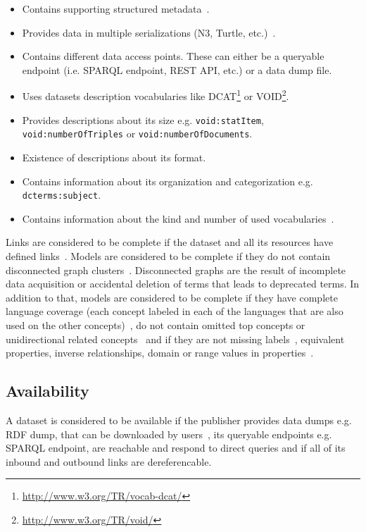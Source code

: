 \begin{itemize}
\item Contains supporting structured metadata~\cite{Hogan:LDOW:10}.
\item Provides data in multiple serializations (N3, Turtle, etc.)~\cite{Zaveri:SemWebJorunal:12}.
\item Contains different data access points. These can either be a queryable endpoint (i.e. SPARQL endpoint, REST API, etc.) or a data dump file.
\item Uses datasets description vocabularies like DCAT\footnote{\url{http://www.w3.org/TR/vocab-dcat/}} or VOID\footnote{\url{http://www.w3.org/TR/void/}}.
\item Provides descriptions about its size e.g. \texttt{void:statItem}, \texttt{void:numberOfTriples} or \texttt{void:numberOf\-Documents}.
\item Existence of descriptions about its format.
\item Contains information about its organization and categorization e.g. \texttt{dcterms:subject}.
\item Contains information about the kind and number of used vocabularies~\cite{Zaveri:SemWebJorunal:12}.
\end{itemize}

Links are considered to be complete if the dataset and all its resources have defined links~\cite{Hogan:LDOW:10,Mader:TBDL:12,Gueret:ESWC:12}. Models are considered to be complete if they do not contain disconnected graph clusters~\cite{Mader:TBDL:12}. Disconnected graphs are the result of incomplete data acquisition or accidental deletion of terms that leads to deprecated terms. In addition to that, models are considered to be complete if they have complete language coverage (each concept labeled in each of the languages that are also used on the other concepts)~\cite{Mader:TBDL:12}, do not contain omitted top concepts or unidirectional related concepts~\cite{Hogan:LDOW:10} and if they are not missing labels~\cite{Mader:TBDL:12}, equivalent properties, inverse relationships, domain or range values in properties~\cite{Maria:KEOD:13}.

\subsection{Availability}
A dataset is considered to be available if the publisher provides data dumps e.g. RDF dump, that can be downloaded by users~\cite{Flemming:Thesis:10,Hogan:LDOW:10}, its queryable endpoints e.g. SPARQL endpoint, are reachable and respond to direct queries and if all of its inbound and outbound links are dereferencable.

